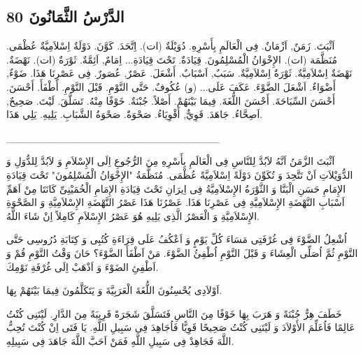 \documentclass[a5paper]{article}
\begin{document}
\subsection{الدَّرْسُ الثَّمَانُونَ 80}
اَثْبَتَ. زَمَنٌ, اَزْمَانٌ. فِى الْعَالَمِ بِأَسْرِهِ. دُوَيْلَةٌ (ات). اِتَّحَدَ. كَوَّنَ. دَوْلَةٌ اِسْلاَمِيَّةٌ عُظْمَى. مُنَظَّمَة (ات). الإِخْوَانُ الْمُسْلِمُونَ. قِيَادَةٌ. تَحْتَ قِيَادَةِ... اِمَامٌ, اَئِمَّةٌ. ثَوْرَةٌ (ات). نَهْضَةٌ. نَهْضَةٌ اِسْلاَمِيَّةٌ. ثَوْرَةٌ اِسْلاَمِيَّةٌ. سَبَبٌ, اَسْبَابٌ. أَشْعَلَ. عَصْرٌ, عُصَورٌ. فِى عَصْرِنَا هَذَا. ضَوْءٌ, أَضْوَاءٌ. اَشْعَلَ الضَّوْءَ. عَكَفَ عَلَى... (و) عُكُوفٌ. حَتَّى النَّوْمِ. قَبْلَ النَّوْمِ. أَطْفَأَ. أَحْسَنَ. أَحْسَنَ السِّبَاحَةَ. أَحْسَنَ اللُّغَةَ. فِيمَا بَيْنَهُمْ. أَصْلاً. جُبْنَةٌ. خَوْفًا مِنْهُ. تَسَلَّقَ. لَيْتَ. صَحِيحٌ, اَصِحَّاءُ. جَاهَدَ. قَوِيٌّ, أَقْوِيَاءُ. صَحْوَةٌ. صَحْوَةُ الشَّبَابِ. يَلِيهِ. يَلِي هَذَا.

\_\_\_\_\_\_\_\_\_\_\_\_\_\_\_\_\_\_\_\_\_\_\_\_\_\_\_\_\_

اَثْبَتَ الزَّمَنُ اَنَّهُ لاَبُدَّ لِلنَّاسِ فِى الْعَالَمِ بِأَسْرِهِ مِنَ الرُّجُوعِ اِلَى الإِسْلاَمِ وَ لاَبُدَّ لِلدُّوَلِ وَ الدُّوَيْلاَتِ اَنْ تَتَّحِدَ وَ تُكَوِّنَ دَوْلَةً اِسْلاَمِيَّةً عُظْمَى. مُنَظَّمَةُ "الإِخْوَانُ الْمُسْلِمُونَ" تَحْتَ قِيَادَةِ الإِمَامِ حَسَنِ الْبَنَّا وَ الثَّوْرَةُ الإِسْلاَمِيَّةُ فِى اِيرَانِ تَحْتَ قِيَادَةِ الإِمَامِ الْخُمَيْنِىِّ كَانَتَا مِنْ اَهَمِّ اَسْبَابِ النَّهْضَةِ الإِسْلاَمِيَّةِ فِى عَصْرِنَا هَذَا. عَصْرُنَا هَذَا عَصْرُ النَّهْضَةِ الإِسْلاَمِيَّةِ وَ الصَّحْوَةِ الإِسْلاَمِيَّةِ وَ الْعَصْرُ الَّذِى يَلِيهِ هُوَ عَصْرُ الإِسْلاَمِ كَامِلاً اِنْ شَاءَ اللَّهُ.

اُشْعِلُ الضَّوْءَ فِى غُرْفَتِى مَسَاءَ كُلِّ يَوْمٍ وَ اَعْكُفُ عَلَى قِرَاءَةِ كُتُبِى وَ كِتَابَةِ دُرُوسِى حَتَّى النَّوْمِ ثُمَّ اُصَلِّى الْعِشَاءَ وَ قَبْلَ النَّوْمِ اُطْفِئُ الضَّوْءَ. مَنْ اَطْفَأَ الضَّوْءَ؟ حَانَ وَقْتُ النَّوْمِ قُمْ وَ اَطْفِئِ الضَوْءَ وَ اَذْهَبْ اِلَى غُرْفَةِ نَوْمِكَ.

اَوْلاَدِى يُحْسِنُونَ اللُّغَةَ الْعَرَبِيَّةَ وَ يَتَكَلَّمُونَ فِيمَا بَيْنَهُمْ بِهَا.

خَطَفَ هِرٌّ جُبْنَةً وَ هَرَبَ بِهَا خَوْفًا مِنَ النَّاسِ فَتَسَلَّقَ شَجَرَةً قَرِيبَةً مِنَ الدَّارِ. لَيْتَنِى كُنْتُ عَالِمًا فَاُعَلِّمَ الأَوْلاَدَ وَ لَيْتَنِى كُنْتُ صَحِيحًا قَوِيًّا فَاُجَاهِدَ فِى سَبِيلِ اللَّهِ. يَا فَتَى اِنْ كُنْتَ تُحِبُّ اللَّهَ فَجَاهِدْ فِى سَبِيلِ اللَّهِ فَمَنْ اَحَبَّ اللَّهَ جَاهَدَ فِى سَبِيلِهِ.
\end{document}
